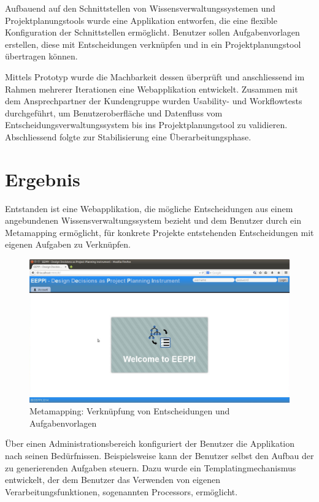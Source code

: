 	Aufbauend auf den Schnittstellen von Wissensverwaltungssystemen und Projektplanungstools wurde eine Applikation entworfen,
	die eine flexible Konfiguration der Schnittstellen ermöglicht.
	Benutzer sollen Aufgabenvorlagen erstellen, diese mit Entscheidungen verknüpfen und in ein Projektplanungstool übertragen können.
	
	Mittels Prototyp wurde die Machbarkeit dessen überprüft
	und anschliessend im Rahmen mehrerer Iterationen eine Webapplikation entwickelt.
	Zusammen mit dem Ansprechpartner der Kundengruppe wurden Usability- und Workflowtests durchgeführt, um Benutzeroberfläche
	und Datenfluss vom Entscheidungsverwaltungssystem bis ins Projektplanungstool zu validieren.
	Abschliessend folgte zur Stabilisierung eine Überarbeitungsphase.
	
	
	\section*{Ergebnis}
		
	Entstanden ist eine Webapplikation, die mögliche Entscheidungen aus einem angebundenen Wissensverwaltungssystem bezieht
	und dem Benutzer durch ein Metamapping ermöglicht, für konkrete Projekte entstehenden Entscheidungen mit eigenen Aufgaben zu Verknüpfen.	
	
	\begin{figure}[H]
		\includegraphics[width=\textwidth]{introduction/img/eeppiDecisionsAndTaskTemplates.jpg}
		\centering
		\caption{Metamapping: Verknüpfung von Entscheidungen und Aufgabenvorlagen}
		\label{fig:metamapping}
	\end{figure}
	
	Über einen  Administrationsbereich konfiguriert der Benutzer die Applikation nach seinen Bedürfnissen.
	Beispielsweise kann der Benutzer selbst den Aufbau der zu generierenden Aufgaben steuern. Dazu wurde ein Templatingmechanismus entwickelt,
	der dem Benutzer das Verwenden von eigenen Verarbeitungsfunktionen, sogenannten Processors, ermöglicht.
	
